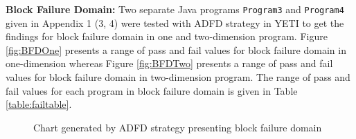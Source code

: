 
\newpage
\noindent \textbf{Block Failure Domain:}  Two separate Java programs \verb+Program3+ and \verb+Program4+ given in Appendix 1 (3, 4) were tested with ADFD strategy in YETI to get the findings for block failure domain in one and two-dimension program. Figure \ref{fig:BFDOne} presents a range of pass and fail values for block failure domain in one-dimension whereas Figure \ref{fig:BFDTwo} presents a range of pass and fail values for block failure domain in two-dimension program. The range of pass and fail values for each program in block failure domain is given in Table \ref{table:failtable}.





\begin{figure} [H]
\centering
{}
\bigskip

\bigskip
\caption{Chart generated by ADFD strategy presenting block failure domain}
\end{figure}


